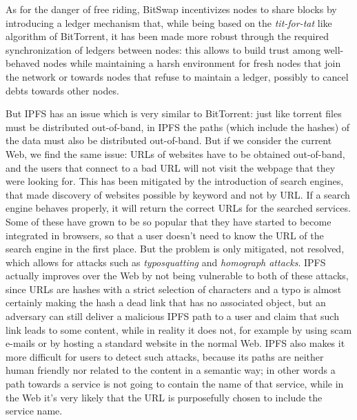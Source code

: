 \documentclass[mscthesis]{usiinfthesis}
\begin{document}
As for the danger of free riding, BitSwap incentivizes nodes to share blocks by introducing a ledger mechanism that, while being based on the \textit{tit-for-tat} like algorithm of BitTorrent, it has been made more robust through the required synchronization of ledgers between nodes: this allows to build trust among well-behaved nodes while maintaining a harsh environment for fresh nodes that join the network or towards nodes that refuse to maintain a ledger, possibly to cancel debts towards other nodes. %

But IPFS has an issue which is very similar to BitTorrent: just like torrent files must be distributed out-of-band, in IPFS the paths (which include the hashes) of the data must also be distributed out-of-band. But if we consider the current Web, we find the same issue: URLs of websites have to be obtained out-of-band, and the users that connect to a bad URL will not visit the webpage that they were looking for. This has been mitigated by the introduction of search engines, that made discovery of websites possible by keyword and not by URL. If a search engine behaves properly, it will return the correct URLs for the searched services. Some of these have grown to be so popular that they have started to become integrated in browsers, so that a user doesn't need to know the URL of the search engine in the first place. But the problem is only mitigated, not resolved, which allows for attacks such as \textit{typosquatting} and \textit{homograph attacks}. IPFS actually improves over the Web by not being vulnerable to both of these attacks, since URLs are hashes with a strict selection of characters and a typo is almost certainly making the hash a dead link that has no associated object, but an adversary can still deliver a malicious IPFS path to a user and claim that such link leads to some content, while in reality it does not, for example by using scam e-mails or by hosting a standard website in the normal Web. IPFS also makes it more difficult for users to detect such attacks, because its paths are neither human friendly nor related to the content in a semantic way; in other words a path towards a service is not going to contain the name of that service, while in the Web it's very likely that the URL is purposefully chosen to include the service name. %
\end{document}
